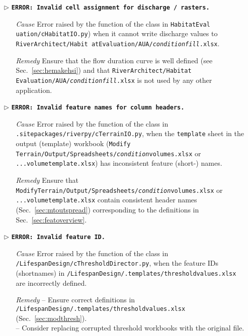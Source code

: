 \begin{itemize}
	\item[$\triangleright$]\textbf{\texttt{ERROR: Invalid cell assignment for discharge / rasters.}}
	\begin{itemize}
		\item[\textit{Cause}\hspace{0.27cm}] Error raised by the  function of the  class in \texttt{HabitatEval uation/cHabitatIO.py}) when it cannot write discharge values to \texttt{RiverArchitect/Habit atEvaluation/AUA/\textit{condition}{\myUnderscore}\textit{fill}.xlsx}.
		\item[\textit{Remedy}] Ensure that the flow duration curve is well defined (see Sec.~\ref{sec:hemakehsi}) and that \texttt{RiverArchitect/Habitat Evaluation/AUA/\textit{condition}{\myUnderscore}\textit{fill}.xlsx} is not used by any other application.\\
	\end{itemize}	
	
	\item[$\triangleright$]\textbf{\texttt{ERROR: Invalid feature names for column headers.}}
	\begin{itemize}
		\item[\textit{Cause}\hspace{0.27cm}] Error raised by the  function of the  class in \texttt{.site{\myUnderscore}packages/riverpy/cTerrainIO.py}, when the \texttt{template} sheet in the output (template) workbook (\texttt{Modify Terrain/Output/Spreadsheets/\textit{condition}{\myUnderscore}volumes.xlsx} or \texttt{...volume{\myUnderscore}template.xlsx}) has inconsistent feature (short-) names.
		\item[\textit{Remedy}] Ensure that \texttt{ModifyTerrain/Output/Spreadsheets/\textit{condition}{\myUnderscore}volumes.xlsx} or \\\texttt{...volume{\myUnderscore}template.xlsx} contain consistent header names (Sec.~\ref{sec:mtoutspread}) corresponding to the definitions in Sec.~\ref{sec:featoverview}.\\
	\end{itemize}
	
	\item[$\triangleright$]\textbf{\texttt{ERROR: Invalid feature ID.}}
	\begin{itemize}
		\item[\textit{Cause}\hspace{0.27cm}] Error raised by the  function of the  class in \texttt{/LifespanDesign/cThresholdDirector.py}, when the feature IDs (shortnames) in \texttt{/LifespanDesign/.templates/threshold{\myUnderscore}values.xlsx} are incorrectly defined.
		\item[\textit{Remedy}] -- Ensure correct definitions in \texttt{/LifespanDesign/.templates/threshold{\myUnderscore}values.xlsx} (Sec.~\ref{sec:modthresh}).\\
								-- Consider replacing corrupted threshold workbooks with the original file.\\
	\end{itemize}
	

\end{itemize}
